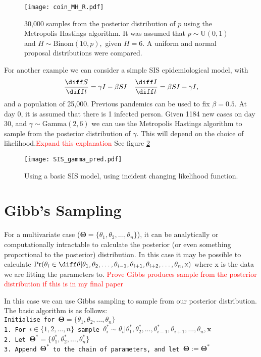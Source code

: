 \begin{figure}[htbp]
    \centering
    \texttt{[image: coin\_MH\_R.pdf]}
    \caption{30,000 samples from the posterior distribution of $p$ using the Metropolis Hastings algorithm. It was assumed that $p\sim \mathrm{U}(0,1)$ and $H \sim \mathrm{Binom}(10, p),$ given $H = 6.$ A uniform and normal proposal distributions were compared.}
    \label{fig:coin_R}
\end{figure}

For another example we can consider a simple SIS epidemiological model, with $$\frac{\diff S}{\diff t} = \gamma I - \beta SI \quad \frac{\diff I}{\diff t} = \beta SI -  \gamma I,$$ and a population of 25,000. Previous pandemics can be used to fix $\beta = 0.5.$ At day 0, it is assumed that there is 1 infected person. Given 1184 new cases on day 30, and $\gamma\sim \mathrm{Gamma}(2, 6)$ we can use the Metropolis Hastings algorithm to sample from the posterior distribution of $\gamma.$  This will depend on the choice of likelihood.\textcolor{red}{Expand this explanation} See figure \ref{fig:SIS_MH_R}

\begin{figure}[htbp]
    \centering
    \texttt{[image: SIS\_gamma\_pred.pdf]}
    \caption{Using a basic SIS model, using incident changing likelihood function.}
    \label{fig:SIS_MH_R}
\end{figure}

\section{Gibb's Sampling}

For a multivariate case ($\mathbf{\Theta} = \{\theta_1, \theta_2, \dots, \theta_n\}$), it can be analytically or computationally intractable to calculate the posterior (or even something proportional to the posterior) distribution. In this case it may be possible to calculate $\Pr(\theta_i\in\diff\theta|\theta_1, \theta_2, \dots, \theta_{i - 1}, \theta_{i+1}, \theta_{i+2}, \dots, \theta_n, \mathrm{x})$ where $\mathrm{x}$ is the data we are fitting the parameters to.
\textcolor{red}{Prove Gibbs produces sample from the posterior distribution if this is in my final paper}

In this case we can use Gibbs sampling to sample from our posterior distribution. The basic algorithm is as follows:
\texttt{\\
    Initialise for $\mathbf{\Theta} = \{\theta_1, \theta_2, \dots, \theta_n\}$\\
    1. For $i\in\{1, 2, \dots, n\}$ sample $\theta_i^* \sim \theta_i|\theta_1^*, \theta_2^*, \dots, \theta_{i-1}^*, \theta_{i+1}, \dots, \theta_n, \mathbf{x}$\\
    2. Let $\mathbf{\Theta}^* = \{\theta_1^*, \theta_2^*, \dots, \theta_n^*\}$\\
    3. Append $\mathbf{\Theta}^*$ to the chain of parameters, and let $\mathbf{\Theta} := \mathbf{\Theta}^*$
}


